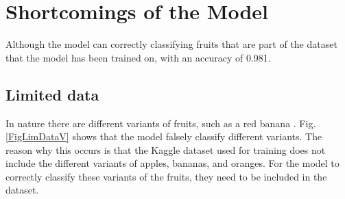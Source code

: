 \documentclass[conference]{IEEEtran}
\begin{document}
\section{Shortcomings of the Model}

Although the model can correctly classifying fruits that are part of the dataset that the model has been trained on, with an accuracy of 0.981.

\subsection{Limited data}

In nature there are different variants of fruits, such as a red banana \cite{b18}. Fig. \ref{FigLimDataV} shows that the model falsely classify different variants. The reason why this occurs is that the Kaggle dataset used for training does not include the different variants of apples, bananas, and oranges. For the model to correctly classify these variants of the fruits, they need to be included in the dataset.
\end{document}
